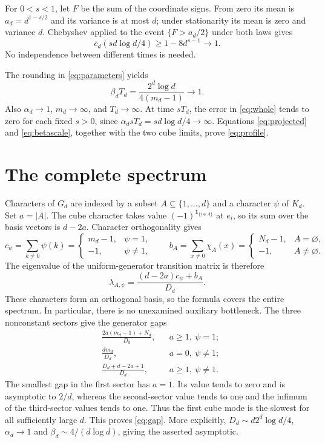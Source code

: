 \documentclass[11pt]{article}
\theoremstyle{remark}\newtheorem{remark}[theorem]{Remark}
\begin{document}
For $0<s<1$, let $F$ be the sum of the coordinate signs. From zero its mean is $a_d=d^{1-s/2}$ and its variance is at most $d$; under stationarity its mean is zero and variance $d$. Chebyshev applied to the event $\{F>a_d/2\}$ under both laws gives
\[
 c_d(s d\log d/4)\ge1-8d^{s-1}\longrightarrow1.
\]
No independence between different times is needed.

The rounding in \eqref{eq:parameters} yields
\begin{equation}\label{eq:betascale}
 \beta_dT_d=\frac{2^d\log d}{4(m_d-1)}\longrightarrow1.
\end{equation}
Also $\alpha_d\to1$, $m_d\to\infty$, and $T_d\to\infty$. At time $sT_d$, the error in \eqref{eq:whole} tends to zero for each fixed $s>0$, since $\alpha_dsT_d=s d\log d/4\to\infty$. Equations \eqref{eq:projected} and \eqref{eq:betascale}, together with the two cube limits, prove \eqref{eq:profile}.

\section{The complete spectrum}
Characters of $G_d$ are indexed by a subset $A\subseteq\{1,\ldots,d\}$ and a character $\psi$ of $K_d$. Set $a=|A|$. The cube character takes value $(-1)^{\mathbf1_{\{i\in A\}}}$ at $e_i$, so its sum over the basis vectors is $d-2a$. Character orthogonality gives
\[
 c_\psi=\sum_{k\ne0}\psi(k)=
 \begin{cases}m_d-1,&\psi=1,\\-1,&\psi\ne1,\end{cases}
 \qquad
 b_A=\sum_{x\ne0}\chi_A(x)=
 \begin{cases}N_d-1,&A=\varnothing,\\-1,&A\ne\varnothing.\end{cases}
\]
The eigenvalue of the uniform-generator transition matrix is therefore
\begin{equation}\label{eq:eigenvalues}
 \lambda_{A,\psi}=\frac{(d-2a)c_\psi+b_A}{D_d}.
\end{equation}
These characters form an orthogonal basis, so the formula covers the entire spectrum. In particular, there is no unexamined auxiliary bottleneck. The three nonconstant sectors give the generator gaps
\begin{align*}
 &\frac{2a(m_d-1)+N_d}{D_d},&& a\ge1,\ \psi=1;\\
 &\frac{d m_d}{D_d},&& a=0,\ \psi\ne1;\\
 &\frac{D_d+d-2a+1}{D_d},&& a\ge1,\ \psi\ne1.
\end{align*}
The smallest gap in the first sector has $a=1$. Its value tends to zero and is asymptotic to $2/d$, whereas the second-sector value tends to one and the infimum of the third-sector values tends to one. Thus the first cube mode is the slowest for all sufficiently large $d$. This proves \eqref{eq:gap}. More explicitly, $D_d\sim d2^d\log d/4$, $\alpha_d\to1$ and $\beta_d\sim4/(d\log d)$, giving the asserted asymptotic.
\end{document}
